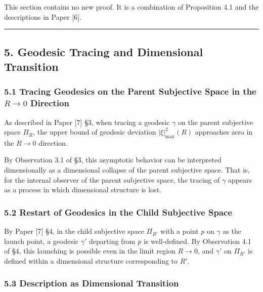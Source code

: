 \documentclass[a4paper,11pt]{article}
\theoremstyle{definition}
\begin{document}
This section contains no new proof. It is a combination of Proposition
4.1 and the descriptions in Paper {[}6{]}.

\begin{center}\rule{0.5\linewidth}{0.5pt}\end{center}

\subsection{5. Geodesic Tracing and Dimensional
Transition}\label{geodesic-tracing-and-dimensional-transition}

\subsubsection{\texorpdfstring{5.1 Tracing Geodesics on the Parent
Subjective Space in the \(R \to 0\)
Direction}{5.1 Tracing Geodesics on the Parent Subjective Space in the R \textbackslash to 0 Direction}}\label{tracing-geodesics-on-the-parent-subjective-space-in-the-r-to-0-direction}

As described in Paper {[}7{]} §3, when tracing a geodesic \(\gamma\) on
the parent subjective space \(\Pi_R\), the upper bound of geodesic
deviation \(|\xi|^2_{\max}(R)\) approaches zero in the \(R \to 0\)
direction.

By Observation 3.1 of §3, this asymptotic behavior can be interpreted
dimensionally as a dimensional collapse of the parent subjective space.
That is, for the internal observer of the parent subjective space, the
tracing of \(\gamma\) appears as a process in which dimensional
structure is lost.

\subsubsection{5.2 Restart of Geodesics in the Child Subjective
Space}\label{restart-of-geodesics-in-the-child-subjective-space}

By Paper {[}7{]} §4, in the child subjective space \(\Pi_{R'}\) with a
point \(p\) on \(\gamma\) as the launch point, a geodesic \(\gamma'\)
departing from \(p\) is well-defined. By Observation 4.1 of §4, this
launching is possible even in the limit region \(R \to 0\), and
\(\gamma'\) on \(\Pi_{R'}\) is defined within a dimensional structure
corresponding to \(R'\).

\subsubsection{5.3 Description as Dimensional
Transition}\label{description-as-dimensional-transition}
\end{document}
